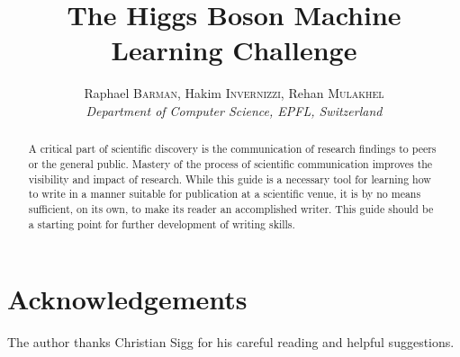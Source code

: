 \documentclass[10pt,conference,compsocconf]{IEEEtran}
\begin{document}
\title{The Higgs Boson Machine Learning Challenge}

\author{
  Raphael \textsc{Barman}, Hakim \textsc{Invernizzi}, Rehan \textsc{Mulakhel} \\
  \textit{Department of Computer Science, EPFL, Switzerland}
}

\maketitle

\begin{abstract}
  A critical part of scientific discovery is the communication of research findings to peers or the general public. Mastery of the process of scientific communication improves the visibility and impact of research. While this guide is a necessary tool for learning how to write in a manner suitable for publication at a scientific venue, it is by no means sufficient, on its own, to make its reader an accomplished writer. This guide should be a starting point for further development of writing skills.
\end{abstract}









\section*{Acknowledgements}
The author thanks Christian Sigg for his careful reading and helpful suggestions.
\end{document}

